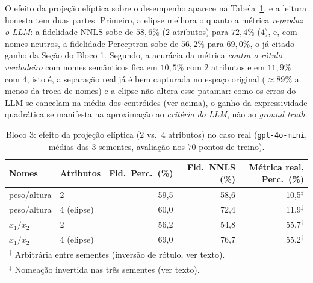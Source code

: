 \documentclass[12pt,a4paper]{article}
\begin{document}
O efeito da projeção elíptica sobre o desempenho aparece na
Tabela~\ref{tab:real_nfeat}, e a leitura honesta tem duas partes. Primeiro, a elipse
melhora o quanto a métrica \emph{reproduz o LLM}: a fidelidade NNLS sobe de $58{,}6\%$
($2$ atributos) para $72{,}4\%$ ($4$), e, com nomes neutros, a fidelidade Perceptron sobe
de $56{,}2\%$ para $69{,}0\%$, o já citado ganho da Seção do Bloco 1. Segundo, a acurácia
da métrica \emph{contra o rótulo verdadeiro} com nomes semânticos fica em $10{,}5\%$ com $2$
atributos e em $11{,}9\%$ com $4$, isto é, a separação real já é bem capturada no espaço
original ($\approx 89\%$ a menos da troca de nomes) e a elipse não altera esse patamar:
como os erros do LLM se cancelam na média dos centróides (ver acima), o ganho da
expressividade quadrática se manifesta na aproximação ao \emph{critério do LLM}, não ao
\emph{ground truth}.

\begin{table}[ht]
\centering
\caption{Bloco 3: efeito da projeção elíptica ($2$ vs.\ $4$ atributos) no caso real
(\texttt{gpt-4o-mini}, médias das $3$ sementes, avaliação nos $70$ pontos de treino).}
\label{tab:real_nfeat}
\small
\begin{tabular}{llrrr}
\toprule
\textbf{Nomes} & \textbf{Atributos} & \textbf{Fid.\ Perc.\ (\%)} &
\textbf{Fid.\ NNLS (\%)} & \textbf{Métrica real, Perc.\ (\%)} \\
\midrule
peso/altura & 2 & 59,5 & 58,6 & 10,5$^\ddagger$ \\
peso/altura & 4 (elipse) & 60,0 & 72,4 & 11,9$^\ddagger$ \\
$x_1/x_2$   & 2 & 56,2 & 54,8 & 55,7$^\dagger$ \\
$x_1/x_2$   & 4 (elipse) & 69,0 & 76,7 & 55,2$^\dagger$ \\
\bottomrule
\multicolumn{5}{l}{\footnotesize $^\dagger$ Arbitrária entre sementes (inversão de
rótulo, ver texto).} \\
\multicolumn{5}{l}{\footnotesize $^\ddagger$ Nomeação invertida nas três sementes (ver texto).}
\end{tabular}
\end{table}
\end{document}
